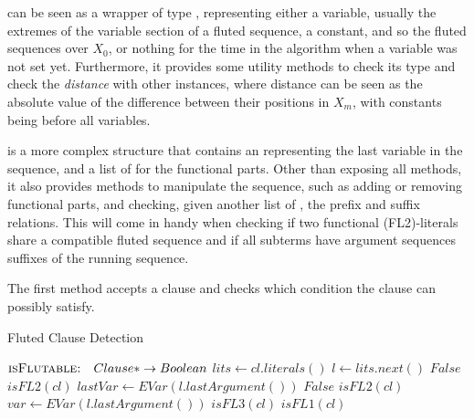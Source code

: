  can be seen as a wrapper of type , representing either a variable, usually the extremes of the variable section of a fluted sequence, a constant, and so the fluted sequences over \(X_0\), or nothing for the time in the algorithm when a variable was not set yet.
Furthermore, it provides some utility methods to check its type and check the \emph{distance} with other  instances, where distance can be seen as the absolute value of the difference between their positions in \(X_m\), with constants being before all variables.

 is a more complex structure that contains an  representing the last variable in the sequence, and a list of  for the functional parts.
Other than exposing all  methods, it also provides methods to manipulate the sequence, such as adding or removing functional parts, and checking, given another list of , the prefix and suffix relations.
This will come in handy when checking if two functional (FL2)-literals share a compatible fluted sequence and if all subterms have argument sequences suffixes of the running sequence.

The first method  accepts a clause and checks which condition the clause can possibly satisfy.

\begin{algorithm}
  \caption{Fluted Clause Detection}
  \begin{algorithmic}[1]
      \Statex{}  \(\textsc{isFlutable:} \quad Clause* \to Boolean\)
        \State{} \(lits \gets cl.literals()\)
        \State{} \(l \gets lits.next()\)
          \State{} \Return{} \(False\)
        \EndIf{}
          \State{} \Return{} \(isFL2(cl)\)
        \EndIf{}
        \State{} \(lastVar \gets EVar(l.lastArgument())\)
            \State{} \Return{} \(False\)
          \EndIf{}
            \State{} \Return{} \(isFL2(cl)\)
          \EndIf{}
          \State{} \(var \gets EVar(l.lastArgument())\)
            \State{} \Return{} \(isFL3(cl)\)
          \EndIf{}
        \EndWhile{}
        \State{} \Return{} \(isFL1(cl)\)
      \EndFunction{}
  \end{algorithmic}
\end{algorithm}

